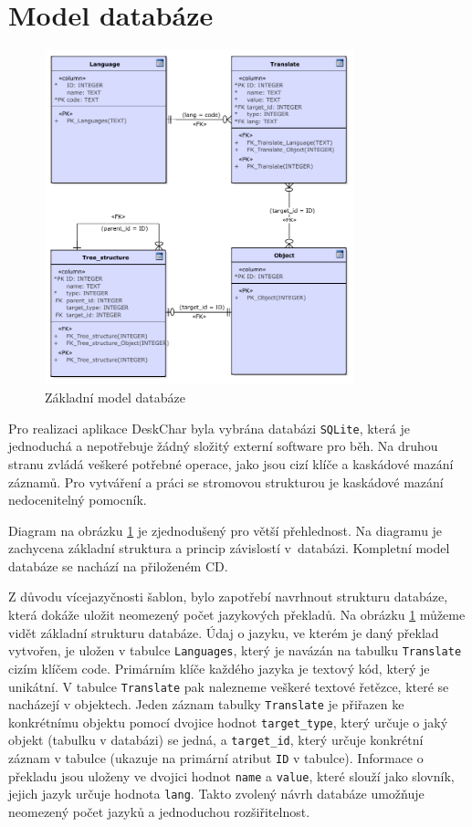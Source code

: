 \documentclass[thesis=B,czech]{resources/FITthesis}[2012/06/26]
\begin{document}
	\section{Model databáze}
	\begin{figure}\centering
	\includegraphics[width=0.8\textwidth]{images/basic_database}
	\caption[Základní model databáze]{Základní model databáze}\label{fig:db_basic}
	\end{figure}
	Pro realizaci aplikace DeskChar byla vybrána databázi \texttt{SQLite}, která je jednoduchá a nepotřebuje žádný složitý externí software pro běh. Na druhou stranu zvládá veškeré potřebné operace, jako jsou cizí klíče a kaskádové mazání záznamů. Pro vytváření a práci se stromovou strukturou je kaskádové mazání nedocenitelný pomocník. \par

Diagram na obrázku \ref{fig:db_basic} je zjednodušený pro větší přehlednost. Na diagramu je zachycena základní struktura a princip závislostí v~databázi. Kompletní model databáze se nachází na přiloženém CD.\par

Z důvodu vícejazyčnosti šablon, bylo zapotřebí navrhnout strukturu databáze, která dokáže uložit neomezený počet jazykových překladů. Na obrázku \ref{fig:db_basic} můžeme vidět základní strukturu databáze. Údaj o jazyku, ve kterém je daný překlad vytvořen, je uložen v tabulce \texttt{Languages}, který je navázán na tabulku \texttt{Translate} cizím klíčem code. Primárním klíče každého jazyka je textový kód, který je unikátní. V tabulce \texttt{Translate} pak nalezneme veškeré textové řetězce, které se nacházejí v objektech. Jeden záznam tabulky \texttt{Translate} je přiřazen ke konkrétnímu objektu pomocí dvojice hodnot \texttt{target\_type}, který určuje o jaký objekt (tabulku v databázi) se jedná, a \texttt{target\_id}, který určuje konkrétní záznam v tabulce (ukazuje na primární atribut \texttt{ID} v tabulce). Informace o překladu jsou uloženy ve dvojici hodnot \texttt{name} a \texttt{value}, které slouží jako slovník, jejich jazyk určuje hodnota \texttt{lang}. Takto zvolený návrh databáze umožňuje neomezený počet jazyků a jednoduchou rozšiřitelnost.\par
\end{document}
